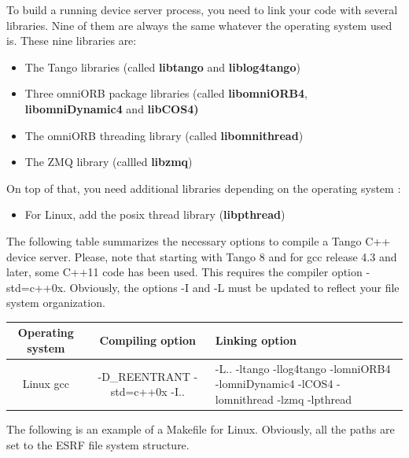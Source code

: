 To build a running device server process, you need to link your code
with several libraries. Nine of them are always the same whatever
the operating system used is. These nine libraries are:
\begin{itemize}
\item The Tango libraries (called \textbf{libtango} and \textbf{liblog4tango})
\item Three omniORB package libraries (called \textbf{libomniORB4},
\textbf{libomniDynamic4} and \textbf{libCOS4)}
\item The omniORB threading library (called \textbf{libomnithread})
\item The ZMQ library (callled \textbf{libzmq})
\end{itemize}
On top of that, you need additional libraries depending on the operating
system :
\begin{itemize}
\item For Linux, add the posix thread library (\textbf{libpthread})
\end{itemize}
The following table summarizes the necessary options to compile a
Tango C++ device server. Please, note that starting with Tango 8 and
for gcc release 4.3 and later, some C++11 code has been
used. This requires the compiler option \textquotedbl{}-std=c++0x\textquotedbl{}.
Obviously, the options -I and -L must be updated to reflect your file
system organization. 

\vspace{0.3cm}

\begin{center}
\begin{longtable}{|c|c|m{70mm}|}
\hline 
Operating system & Compiling option & Linking option\tabularnewline
\hline 
\hline 
Linux gcc & -D\_REENTRANT -std=c++0x -I.. & -L.. -ltango -llog4tango -lomniORB4 -lomniDynamic4 -lCOS4 -lomnithread
-lzmq -lpthread\tabularnewline
\hline 
\end{longtable}
\par\end{center}

\vspace{0.3cm}

The following is an example of a Makefile for Linux. Obviously, all
the paths are set to the ESRF file system structure.

